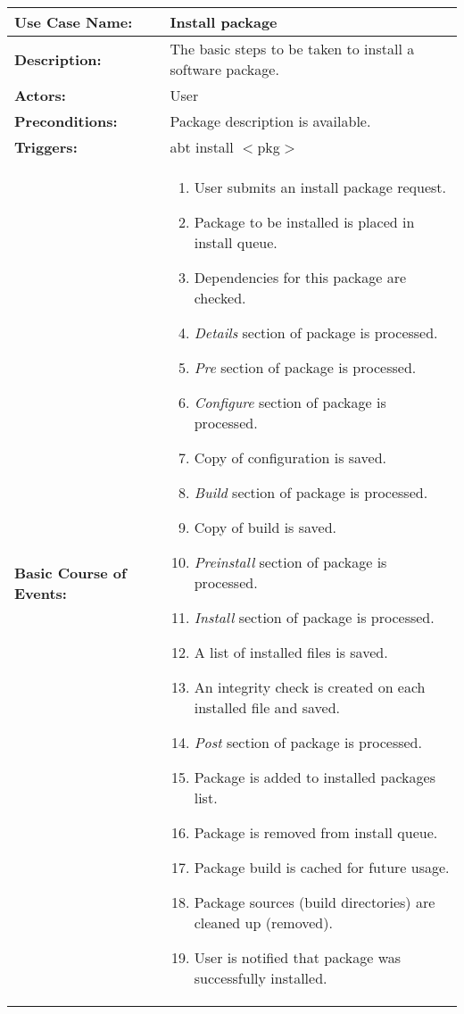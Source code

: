
\begin{tabularx}{\linewidth}{|l|X|}
\hline
\textbf{Use Case Name:} & \textbf{Install package} \\
\hline
\textbf{Description:} & 
The basic steps to be taken to install a software package. \\
\hline
\textbf{Actors:} & User \\
\hline
\textbf{Preconditions:} & Package description is available. \\
\hline
\textbf{Triggers:} & abt install $<$pkg$>$ \\
\hline
\textbf{Basic Course of Events:} & 
\begin{minipage}{\linewidth} 
  \vspace{0.05em}
  \begin{enumerate}
    \item User submits an install package request.
    \item Package to be installed is placed in install queue.
    \item Dependencies for this package are checked.
    \item \emph{Details} section of package is processed.
    \item \emph{Pre} section of package is processed.
    \item \emph{Configure} section of package is processed.
    \item Copy of configuration is saved.
    \item \emph{Build} section of package is processed.
    \item Copy of build is saved.
    \item \emph{Preinstall} section of package is processed.
    \item \emph{Install} section of package is processed.
    \item A list of installed files is saved.
    \item An integrity check is created on each installed file and saved.
    \item \emph{Post} section of package is processed.
    \item Package is added to installed packages list.
    \item Package is removed from install queue.
    \item Package build is cached for future usage.
    \item Package sources (build directories) are cleaned up (removed).
    \item User is notified that package was successfully installed.
  \end{enumerate}
  \vspace{0.05em}
\end{minipage}
\\
\hline
\end{tabularx}

